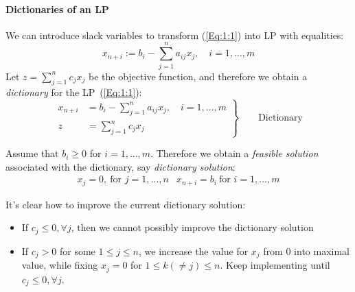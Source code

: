 \paragraph{Dictionaries of an LP}
We can introduce slack variables to transform (\ref{Eq:1:1}) into LP with equalities:
\[
x_{n+i}:=b_i - \sum_{j=1}^na_{ij}x_j,\quad i=1,\dots,m
\]
Let $z=\sum_{j=1}^nc_jx_j$ be the objective function, and therefore we obtain a \emph{dictionary} for the LP~(\ref{Eq:1:1}):
\begin{equation}
\left.
\begin{aligned}
x_{n+i}&=b_i - \sum_{j=1}^na_{ij}x_j,\quad i=1,\dots,m\\
z&=\sum_{j=1}^nc_jx_j
\end{aligned}
\right\}\qquad \text{Dictionary}
\end{equation}

Assume that $b_i\ge0$ for $i=1,\dots,m$. Therefore we obtain a \emph{feasible solution} associated with the dictionary, say \emph{dictionary solution}:
\[
\begin{array}{ll}
x_j=0,\ \text{for $j=1,\dots,n$}
&
x_{n+i}=b_i \ \text{for $i=1,\dots,m$}
\end{array}
\]

It's clear how to improve the current dictionary solution:
\begin{itemize}
\item
If $c_j\le0,\forall j$, then we cannot possibly improve the dictionary solution
\item
If $c_j>0$ for some $1\le j\le n$, we increase the value for $x_j$ from $0$ into maximal value, while fixing $x_j=0$ for $1\le k(\ne j)\le n$. Keep implementing until $c_j\le0,\forall j$.
\end{itemize}


